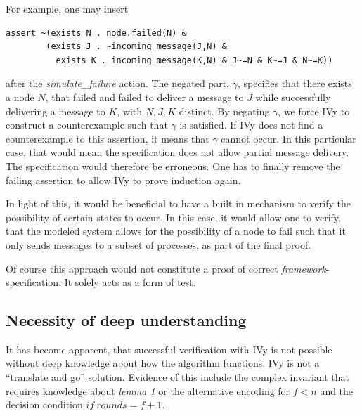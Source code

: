\documentclass[fleqn]{article}
\begin{document}
\noindent For example, one may insert
\begin{mdframed}[nobreak=true, backgroundcolor=light-gray, roundcorner=10pt,leftmargin=1, rightmargin=1, innerleftmargin=15, innertopmargin=15,innerbottommargin=15, outerlinewidth=1, linecolor=light-gray]
\begin{lstlisting}
assert ~(exists N . node.failed(N) &
        (exists J . ~incoming_message(J,N) &
          exists K . incoming_message(K,N) & J~=N & K~=J & N~=K))
\end{lstlisting}
\end{mdframed}
after the \textit{simulate\_failure} action. The negated part, $\gamma$, specifies that there exists a node $N$, that failed and failed to deliver a message to $J$ while successfully delivering a message to $K$, with $N,J,K$ distinct. By negating $\gamma$, we force IVy to construct a counterexample such that $\gamma$ is satisfied. If IVy does not find a counterexample to this assertion, it means that $\gamma$ cannot occur. In this particular case, that would mean the specification does not allow partial message delivery. The specification would therefore be erroneous. One has to finally remove the failing assertion to allow IVy to prove induction again.

In light of this, it would be beneficial to have a built in mechanism to verify the possibility of certain states to occur. In this case, it would allow one to verify, that the modeled system allows for the possibility of a node to fail such that it only sends messages to a subset of processes, as part of the final proof.

Of course this approach would not constitute a proof of correct \textit{framework}-specification. It solely acts as a form of test.

\subsection{Necessity of deep understanding}
It has become apparent, that successful verification with IVy is not possible without deep knowledge about how the algorithm functions. IVy is not a ``translate and go'' solution.
Evidence of this include the complex invariant that requires knowledge about \textit{lemma 1} or the alternative encoding for $f<n$ and the decision condition $if\ rounds = f+1$.
\end{document}
